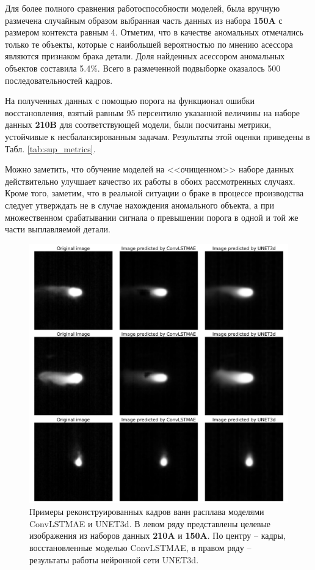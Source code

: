 \documentclass{article}
\begin{document}
    Для более полного сравнения работоспособности моделей, была вручную размечена случайным образом выбранная часть данных из набора \textbf{150A} с размером контекста равным 4. Отметим, что в качестве аномальных отмечались только те объекты, которые с наибольшей вероятностью по мнению асессора являются признаком брака детали. Доля найденных асессором аномальных объектов составила 5.4\%. Всего в размеченной подвыборке оказалось 500 последовательностей кадров.
    
    На полученных данных с помощью порога на функционал ошибки восстановления, взятый равным 95 персентилю указанной величины на наборе данных \textbf{210B} для соответствующей модели, были посчитаны метрики, устойчивые к несбалансированным задачам. Результаты этой оценки приведены в Табл. \ref{tab:sup_metrics}.
    
    Можно заметить, что обучение моделей на <<очищенном>> наборе данных действительно улучшает качество их работы в обоих рассмотренных случаях. Кроме того, заметим, что в реальной ситуации о браке в процессе производства следует утверждать не в случае нахождения аномального объекта, а при множественном срабатывании сигнала о превышении порога в одной и той же части выплавляемой детали. 


    \begin{figure}[]
        \centering
        \includegraphics[scale=.3]{reconstr_examples.pdf}
        \caption{Примеры реконструированных кадров ванн расплава моделями ConvLSTMAE и UNET3d. В левом ряду представлены целевые изображения из наборов данных \textbf{210A} и \textbf{150A}. По центру -- кадры, восстановленные моделью ConvLSTMAE, в правом ряду -- результаты работы нейронной сети UNET3d.}\label{reconstr_examples}
    \end{figure}
\end{document}

